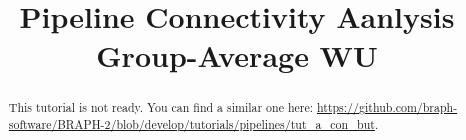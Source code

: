 \documentclass[justified]{tufte-handout}
\title{Pipeline Connectivity Aanlysis Group-Average WU}
\begin{document}
\maketitle

\begin{abstract}
\noindent
This tutorial is not ready. You can find a similar one here: \url{https://github.com/braph-software/BRAPH-2/blob/develop/tutorials/pipelines/tut_a_con_but}.
\end{abstract}
\end{document}
